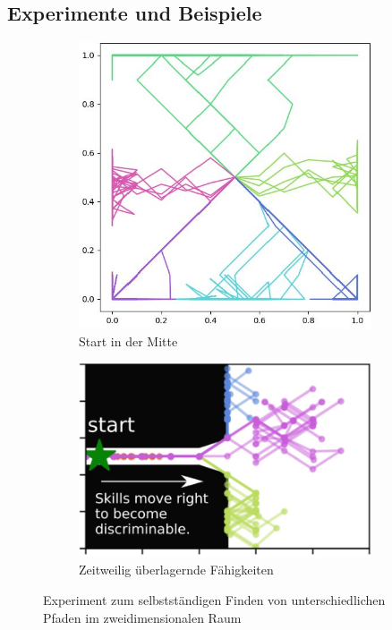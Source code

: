 \subsection{Experimente und Beispiele}
\label{sec:examplesdiversity}
\begin{figure}[h]
\begin{subfigure}{0.41\textwidth}
\includegraphics[width=0.95\textwidth]{images/example_diayn_1.JPG}
\caption{Start in der Mitte} \label{img:diayn_ex1}
\end{subfigure}
\begin{subfigure}{0.59\textwidth}
\includegraphics[width=0.95\textwidth, right]{images/example_diayn_2.JPG}
\caption{Zeitweilig überlagernde Fähigkeiten} \label{img:diayn_ex2}
\end{subfigure}
\caption{Experiment zum selbstständigen Finden von unterschiedlichen Pfaden im zweidimensionalen Raum} \label{img:diayn_ex}
\end{figure}

